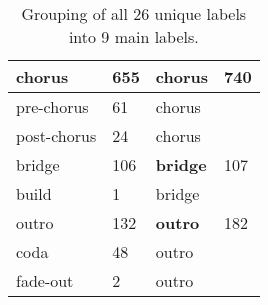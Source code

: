 \begin{table}[t]
\begin{tabular}{|l|l|l|l|}
    chorus        & 655                & \textbf{chorus}        & 740                \\ \hline
    pre-chorus    & 61                 & chorus        &                    \\ \hline
    post-chorus   & 24                 & chorus        &                    \\ \hline
    bridge        & 106                & \textbf{bridge}        & 107                \\ \hline
    build         & 1                  & bridge        &                    \\ \hline
    outro         & 132                & \textbf{outro}         & 182                \\ \hline
    coda          & 48                 & outro         &                    \\ \hline
    fade-out      & 2                  & outro         &                    \\ \hline
    \end{tabular}
    \caption{Grouping of all 26 unique labels into 9 main labels.}
    \label{tab:label_grouping}
\end{table}